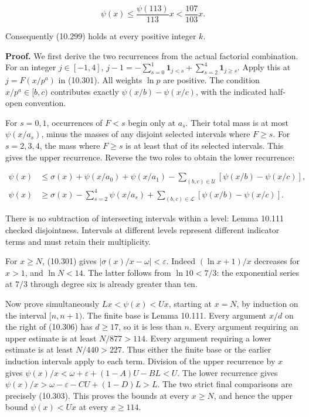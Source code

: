 \documentclass[
  11pt,
  a4paper,
]{article}
\begin{document}
\[
\psi(x)\le\frac{\psi(113)}{113}x<\frac{107}{103}x.
\tag{10.305}
\]

Consequently (10.299) holds at every positive integer \(k\).

\textbf{Proof.} We first derive the two recurrences from the actual
factorial combination. For an integer \(j\in[-1,4]\),
\(j-1=-\sum_{s=0}^1\mathbf1_{j<s}+\sum_{s=2}^4\mathbf1_{j\ge s}\). Apply
this at \(j=F(x/p^a)\) in (10.301). All weights \(\ln p\) are positive.
The condition \(x/p^a\in[b,c)\) contributes exactly
\(\psi(x/b)-\psi(x/c)\), with the indicated half-open convention.

For \(s=0,1\), occurrences of \(F<s\) begin only at \(a_s\). Their total
mass is at most \(\psi(x/a_s)\), minus the masses of any disjoint
selected intervals where \(F\ge s\). For \(s=2,3,4\), the mass where
\(F\ge s\) is at least that of its selected intervals. This gives the
upper recurrence. Reverse the two roles to obtain the lower recurrence:

\[
\begin{aligned}
\psi(x)&\le\sigma(x)+\psi(x/a_0)+\psi(x/a_1)
 -\sum_{(b,c)\in\mathcal U}[\psi(x/b)-\psi(x/c)],\\
\psi(x)&\ge\sigma(x)-\sum_{s=2}^4\psi(x/a_s)
 +\sum_{(b,c)\in\mathcal L}[\psi(x/b)-\psi(x/c)].
\end{aligned}
\tag{10.306}
\]

There is no subtraction of intersecting intervals within a level: Lemma
10.111 checked disjointness. Intervals at different levels represent
different indicator terms and must retain their multiplicity.

For \(x\ge N\), (10.301) gives \(|\sigma(x)/x-\omega|<\varepsilon\).
Indeed \((\ln x+1)/x\) decreases for \(x>1\), and \(\ln N<14\). The
latter follows from \(\ln10<7/3\): the exponential series at \(7/3\)
through degree six is already greater than ten.

Now prove simultaneously \(Lx<\psi(x)<Ux\), starting at \(x=N\), by
induction on the interval \([n,n+1)\). The finite base is Lemma 10.111.
Every argument \(x/d\) on the right of (10.306) has \(d\ge17\), so it is
less than \(n\). Every argument requiring an upper estimate is at least
\(N/877>114\). Every argument requiring a lower estimate is at least
\(N/440>227\). Thus either the finite base or the earlier induction
intervals apply to each term. Division of the upper recurrence by \(x\)
gives \(\psi(x)/x<\omega+\varepsilon+(1-A)U-BL<U\). The lower recurrence
gives \(\psi(x)/x>\omega-\varepsilon-CU+(1-D)L>L\). The two strict final
comparisons are precisely (10.303). This proves the bounds at every
\(x\ge N\), and hence the upper bound \(\psi(x)<Ux\) at every
\(x\ge114\).
\end{document}
